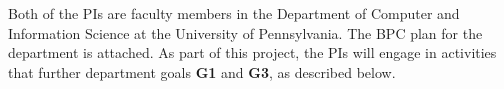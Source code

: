 




Both of the PIs are faculty members in the Department of Computer and Information
Science at the University of Pennsylvania. The BPC plan for the department is
attached. As part of this project, the PIs will engage in activities that
further department goals \textbf{G1} and \textbf{G3}, as described below.

